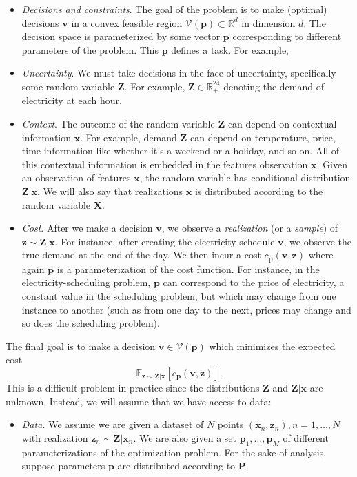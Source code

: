 \documentclass{article}
\newcommand{\p}[0]{\mathbf{p}}
\newcommand{\x}[0]{\mathbf{x}}
\renewcommand{\v}[0]{\mathbf{v}}
\newcommand{\z}[0]{\mathbf{z}}
\newcommand{\Z}[0]{\mathbf{Z}}
\newcommand{\R}[0]{\mathbb{R}}
\theoremstyle{plain}
\theoremstyle{definition}
\theoremstyle{remark}
\begin{document}
\begin{itemize}[leftmargin=*]
    \item \emph{Decisions and constraints}. The goal of the problem is to make (optimal) decisions $\v$ in a convex feasible region $\mathcal{V}(\p) \subset \R^d$ in dimension $d$. The decision space is parameterized by some vector $\p$ corresponding to different parameters of the problem. This $\p$ defines a task. For example, 
    \item \emph{Uncertainty}. We must take decisions in the face of uncertainty, specifically some random variable $\Z$. For example, $\Z \in \R^{24}_{+}$ denoting the demand of electricity at each hour.
    \item \emph{Context}. The outcome of the random variable $\Z$ can depend on contextual information $\x$. For example, demand $\Z$ can depend on temperature, price, time information like whether it's a weekend or a holiday, and so on. All of this contextual information is embedded in the features observation $\x$. Given an observation of features $\x$, the random variable has conditional distribution $\Z | \x$. We will also say that realizations $\x$ is distributed according to the random variable $\mathbf{X}$.
    \item \emph{Cost}. After we make a decision $\v$, we observe a \emph{realization} (or a \emph{sample}) of $\z \sim \Z|\x$. For instance, after creating the electricity schedule $\v$, we observe the true demand at the end of the day. We then incur a cost $c_{\p}(\v, \z)$ where again $\p$ is a parameterization of the cost function. For instance, in the electricity-scheduling problem, $\p$ can correspond to the price of electricity, a constant value in the scheduling problem, but which may change from one instance to another (such as from one day to the next, prices may change and so does the scheduling problem).
\end{itemize}
The final goal is to make a decision $\v \in \mathcal{V}(\p)$ which minimizes the expected cost
\begin{equation}
    \mathbb{E}_{\z \sim \Z|\x}[c_{\p}(\v, \z)].
\end{equation}
This is a difficult problem in practice since the distributions $\Z$ and $\Z|\x$ are unknown. Instead, we will assume that we have access to data:
\begin{itemize}
    \item \emph{Data.} We assume we are given a dataset of $N$ points $(\x_n, \z_n), n = 1,\dots,N$ with realization  $\z_n \sim \Z|\x_n$. We are also given a set $\p_1, \dots, \p_M$ of different parameterizations of the optimization problem. For the sake of analysis, suppose parameters $\p$ are distributed according to $\mathbf{P}$.
\end{itemize}
\end{document}
